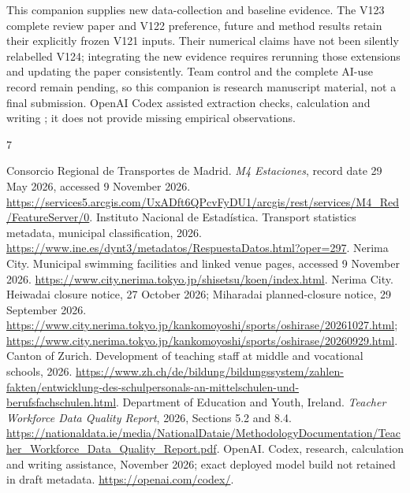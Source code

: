 \documentclass[12pt]{article}
\begin{document}
This companion supplies new data-collection and baseline evidence. The V123
complete review paper and V122 preference, future and method results retain
their explicitly frozen V121 inputs. Their numerical claims have not been
silently relabelled V124; integrating the new evidence requires rerunning those
extensions and updating the paper consistently. Team control and the complete
AI-use record remain pending, so this companion is research manuscript material,
not a final submission. OpenAI Codex assisted extraction checks, calculation and
writing \cite{codex}; it does not provide missing empirical observations.

\begin{thebibliography}{7}
\raggedright
{} Consorcio Regional de Transportes de Madrid. \textit{M4 Estaciones},
record date 29 May 2026, accessed 9 November 2026.
\url{https://services5.arcgis.com/UxADft6QPcvFyDU1/arcgis/rest/services/M4_Red/FeatureServer/0}.
 Instituto Nacional de Estad\'istica. Transport statistics metadata,
municipal classification, 2026.
\url{https://www.ine.es/dynt3/metadatos/RespuestaDatos.html?oper=297}.
 Nerima City. Municipal swimming facilities and linked venue pages,
accessed 9 November 2026.
\url{https://www.city.nerima.tokyo.jp/shisetsu/koen/index.html}.
 Nerima City. Heiwadai closure notice, 27 October 2026;
Miharadai planned-closure notice, 29 September 2026.
\url{https://www.city.nerima.tokyo.jp/kankomoyoshi/sports/oshirase/20261027.html};
\url{https://www.city.nerima.tokyo.jp/kankomoyoshi/sports/oshirase/20260929.html}.
 Canton of Zurich. Development of teaching staff at middle and vocational schools, 2026.
\url{https://www.zh.ch/de/bildung/bildungssystem/zahlen-fakten/entwicklung-des-schulpersonals-an-mittelschulen-und-berufsfachschulen.html}.
 Department of Education and Youth, Ireland. \textit{Teacher Workforce Data Quality Report}, 2026, Sections 5.2 and 8.4.
\url{https://nationaldata.ie/media/NationalDataie/MethodologyDocumentation/Teacher_Workforce_Data_Quality_Report.pdf}.
 OpenAI. Codex, research, calculation and writing assistance, November 2026; exact deployed model build not retained in draft metadata.
\url{https://openai.com/codex/}.
\end{thebibliography}
\end{document}

